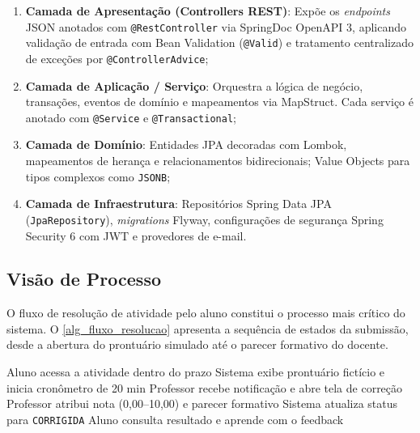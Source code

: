 \begin{enumerate}
    \item \textbf{Camada de Apresentação (Controllers REST)}: Expõe os
    \textit{endpoints} JSON anotados com \texttt{@RestController} via
    SpringDoc OpenAPI 3, aplicando validação de entrada com Bean Validation
    (\texttt{@Valid}) e tratamento centralizado de exceções por
    \texttt{@ControllerAdvice};
    \item \textbf{Camada de Aplicação / Serviço}: Orquestra a lógica de
    negócio, transações, eventos de domínio e mapeamentos via MapStruct.
    Cada serviço é anotado com \texttt{@Service} e \texttt{@Transactional};
    \item \textbf{Camada de Domínio}: Entidades JPA decoradas com Lombok,
    mapeamentos de herança e relacionamentos bidirecionais; Value Objects
    para tipos complexos como \texttt{JSONB};
    \item \textbf{Camada de Infraestrutura}: Repositórios Spring Data JPA
    (\texttt{JpaRepository}), \textit{migrations} Flyway, configurações de
    segurança Spring Security 6 com JWT e provedores de e-mail.
\end{enumerate}

\subsection{Visão de Processo}
\label{subsec_visao_processo}

O fluxo de resolução de atividade pelo aluno constitui o processo mais
crítico do sistema. O \autoref{alg_fluxo_resolucao} apresenta a
sequência de estados da submissão, desde a abertura do prontuário
simulado até o parecer formativo do docente.

\begin{algoritmo}[htb]
\caption{Fluxo de Resolução de Atividade GTT (SIGEA-GTT)}
\label{alg_fluxo_resolucao}
\begin{algorithm}[H]
Aluno acessa a atividade dentro do prazo\;
Sistema exibe prontuário fictício e inicia cronômetro de 20 min\;
Professor recebe notificação e abre tela de correção\;
Professor atribui nota (0,00--10,00) e parecer formativo\;
Sistema atualiza status para \texttt{CORRIGIDA}\;
Aluno consulta resultado e aprende com o feedback\;
\end{algorithm}
\end{algoritmo}


